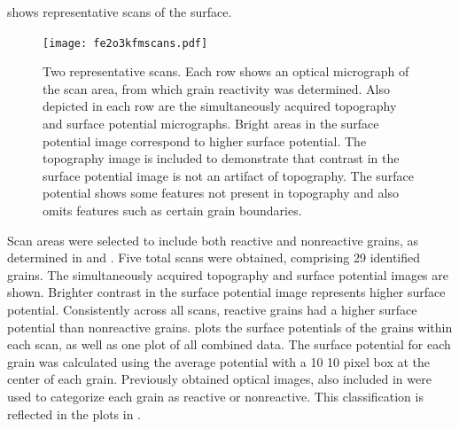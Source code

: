  shows representative  scans of the  surface.
\begin{figure}
	\texttt{[image: fe2o3kfmscans.pdf]}
	\caption[Two representative  scans]{%
		Two representative  scans. Each row shows an optical micrograph of the
scan area, 
		from which grain reactivity was determined. Also depicted in each row are the simultaneously 
		acquired topography and surface potential micrographs. Bright areas in the surface
		potential image correspond to higher surface potential. The topography image is
		included to demonstrate that contrast in the surface potential image is not an artifact of
		topography. The surface potential shows some features not present in topography and also 
		omits features such as certain grain boundaries.}
	\label{fig:fe2o3kfmscans}
\end{figure}
Scan areas were selected to include both reactive and nonreactive grains, as determined in
 and . Five total scans were obtained,
comprising 29 identified grains. The simultaneously acquired topography and surface
potential images are shown. Brighter contrast in the surface potential image represents
higher surface potential. Consistently across all scans, reactive grains had a higher
surface potential than nonreactive grains.  plots the surface
potentials of the grains within each scan, as well as one plot of all combined data. The
surface potential for each grain was calculated using the average potential with a 10
\texttimes{} 10 pixel box at the center of each grain. Previously obtained optical images,
also included in  were used to categorize each grain as reactive
or nonreactive. This classification is reflected in the plots in
.
